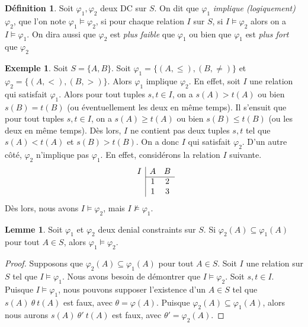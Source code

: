 \documentclass[letterpaper, 12pt]{report}
\theoremstyle{definition}
\newtheorem{mydef}{Définition}
\newtheorem{mylemma}{Lemme}
\newtheorem{myexample}{Exemple}
\begin{document}
\begin{mydef}
Soit $\varphi_1,\varphi_2$ deux DC sur $S$. On dit que $\varphi_1$ \emph{implique (logiquement)} $\varphi_2$, que l'on note $\varphi_1 \models\varphi_2$, si pour chaque relation $I$ sur $S$, si $I \models \varphi_2$ alors on a $I \models \varphi_1$. On dira aussi que $\varphi_2$ est \emph{plus faible} que $\varphi_1$ ou bien que $\varphi_1$ est \emph{plus fort} que $\varphi_2$
\end{mydef}

\begin{myexample}
Soit $S=\{A,B\}$.
Soit $\varphi_1=\{(A,\leq),(B,\neq)\}$ et $\varphi_2=\{(A,<),(B,>)\}$.
Alors $\varphi_1$ implique $\varphi_2$.
En effet, soit $I$ une relation qui satisfait $\varphi_1$.
Alors pour tout tuples $s,t\in I$, on a $s(A)>t(A)$ ou bien $s(B)=t(B)$ (ou éventuellement les deux en même temps).
Il s'ensuit que pour tout tuples $s,t\in I$, on a $s(A)\geq t(A)$ ou bien $s(B)\leq t(B)$ (ou les deux en même temps).
Dès lors, $I$ ne contient pas deux tuples $s,t$ tel que  $s(A)<t(A)$ et $s(B)>t(B)$.
On a donc $I$ qui satisfait $\varphi_2$.
D'un autre côté, $\varphi_2$ n'implique pas $\varphi_1$.
En effet, considérons la relation $I$ suivante.
$$
\begin{array}{c|cc}
I & A & B\\\cline{2-3}
  & 1 & 2\\
  & 1 & 3
\end{array}  
$$
Dès lors, nous avons $I\models\varphi_2$, mais $I\not\models\varphi_1$.
\end{myexample}

\begin{mylemma}\label{lem:characterization}
Soit $\varphi_1$ et $\varphi_2$ deux denial constraints sur $S$.
Si $\varphi_2(A)\subseteq\varphi_1(A)$ pour tout $ A\in S$, alors $\varphi_1\models\varphi_2$.
\end{mylemma}
\begin{proof}
Supposons que $\varphi_2(A)\subseteq\varphi_1(A)$ pour tout $A\in S$.
Soit $I$ une relation sur $S$ tel que $I\models\varphi_1$.
Nous avons besoin de démontrer que $I\models\varphi_2$.
Soit $s,t\in I$.
Puisque $I\models\varphi_1$, nous pouvons supposer l'existence d'un $A\in S$ tel que $s(A)\ \theta\ t(A)$ est faux, avec $\theta=\varphi(A)$. 
Puisque $\varphi_2(A)\subseteq\varphi_1(A)$,
alors nous aurons $s(A)\ \theta'\ t(A)$ est faux, avec $\theta'=\varphi_2(A)$.
\end{proof}
\end{document}
